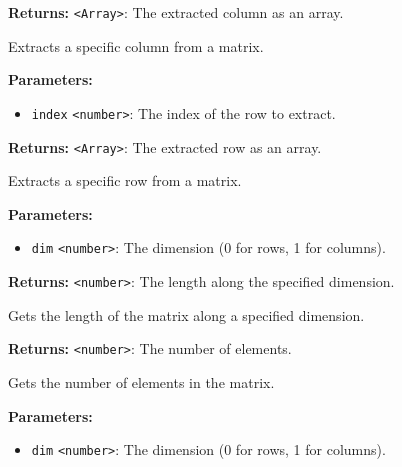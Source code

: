 \documentclass[12pt,a4paper]{article}
\begin{document}
\noindent \textbf{Returns:} \texttt{<Array>}: The extracted column as an array.

\noindent Extracts a specific column from a matrix.

\vspace{5mm}
\noindent {}


\noindent \textbf{Parameters:}
\begin{itemize}
  \item \texttt{index} \texttt{<number>}: The index of the row to extract.
\end{itemize}

\noindent \textbf{Returns:} \texttt{<Array>}: The extracted row as an array.

\noindent Extracts a specific row from a matrix.

\vspace{5mm}
\noindent {}


\noindent \textbf{Parameters:}
\begin{itemize}
  \item \texttt{dim} \texttt{<number>}: The dimension (0 for rows, 1 for columns).
\end{itemize}

\noindent \textbf{Returns:} \texttt{<number>}: The length along the specified dimension.

\noindent Gets the length of the matrix along a specified dimension.

\vspace{5mm}
\noindent {}


\noindent \textbf{Returns:} \texttt{<number>}: The number of elements.

\noindent Gets the number of elements in the matrix.

\vspace{5mm}
\noindent {}


\noindent \textbf{Parameters:}
\begin{itemize}
  \item \texttt{dim} \texttt{<number>}: The dimension (0 for rows, 1 for columns).
\end{itemize}
\end{document}

